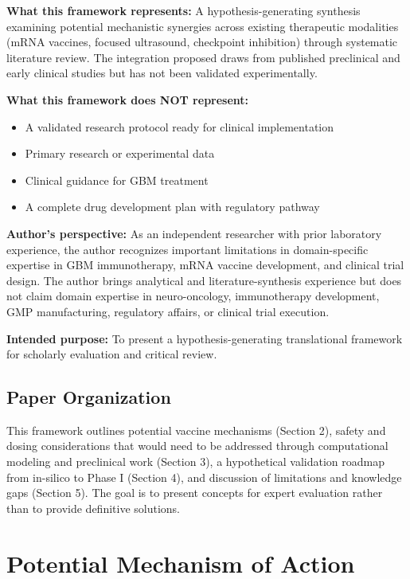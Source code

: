 \documentclass[12pt]{article}
\begin{document}
\textbf{What this framework represents:} A hypothesis-generating synthesis examining potential mechanistic synergies across existing therapeutic modalities (mRNA vaccines, focused ultrasound, checkpoint inhibition) through systematic literature review. The integration proposed draws from published preclinical and early clinical studies but has not been validated experimentally.

\textbf{What this framework does NOT represent:} 
\begin{itemize}[leftmargin=*,noitemsep]
\item A validated research protocol ready for clinical implementation
\item Primary research or experimental data
\item Clinical guidance for GBM treatment
\item A complete drug development plan with regulatory pathway
\end{itemize}

\textbf{Author's perspective:} As an independent researcher with prior laboratory experience, the author recognizes important limitations in domain-specific expertise in GBM immunotherapy, mRNA vaccine development, and clinical trial design. The author brings analytical and literature-synthesis experience but does not claim domain expertise in neuro-oncology, immunotherapy development, GMP manufacturing, regulatory affairs, or clinical trial execution.

\textbf{Intended purpose:} To present a hypothesis-generating translational framework for scholarly evaluation and critical review.

\subsection{Paper Organization}
This framework outlines potential vaccine mechanisms (Section 2), safety and dosing considerations that would need to be addressed through computational modeling and preclinical work (Section 3), a hypothetical validation roadmap from in-silico to Phase I (Section 4), and discussion of limitations and knowledge gaps (Section 5). The goal is to present concepts for expert evaluation rather than to provide definitive solutions.

\section{Potential Mechanism of Action}
\end{document}
